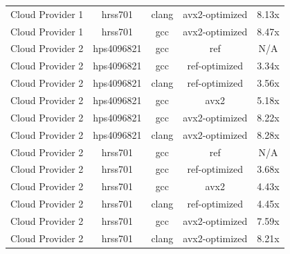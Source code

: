 \begin{table}
\begin{tabularx}{\linewidth}{X c c c c}
            Cloud Provider 1 &              hrss701 &                clang &       avx2-optimized &                8.13x\\
            Cloud Provider 1 &              hrss701 &                  gcc &       avx2-optimized &                8.47x\\
            Cloud Provider 2 &           hps4096821 &                  gcc &                  ref &                  N/A\\
            Cloud Provider 2 &           hps4096821 &                  gcc &        ref-optimized &                3.34x\\
            Cloud Provider 2 &           hps4096821 &                clang &        ref-optimized &                3.56x\\
            Cloud Provider 2 &           hps4096821 &                  gcc &                 avx2 &                5.18x\\
            Cloud Provider 2 &           hps4096821 &                  gcc &       avx2-optimized &                8.22x\\
            Cloud Provider 2 &           hps4096821 &                clang &       avx2-optimized &                8.28x\\
            Cloud Provider 2 &              hrss701 &                  gcc &                  ref &                  N/A\\
            Cloud Provider 2 &              hrss701 &                  gcc &        ref-optimized &                3.68x\\
            Cloud Provider 2 &              hrss701 &                  gcc &                 avx2 &                4.43x\\
            Cloud Provider 2 &              hrss701 &                clang &        ref-optimized &                4.45x\\
            Cloud Provider 2 &              hrss701 &                  gcc &       avx2-optimized &                7.59x\\
            Cloud Provider 2 &              hrss701 &                clang &       avx2-optimized &                8.21x\\
        \bottomrule
    \end{tabularx}
\end{table}

